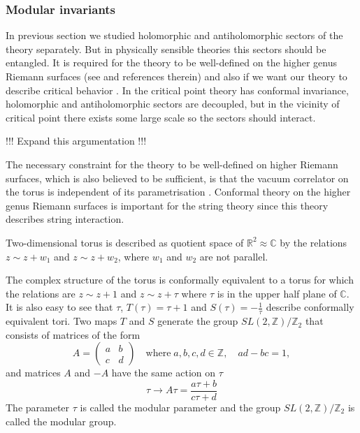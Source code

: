 \documentclass[a4paper,12pt]{article}
\theoremstyle{definition} \newtheorem{Def}{Definition}
\begin{document}
\subsubsection{Modular invariants}
\label{sec:modular-invariants}

In previous section we studied holomorphic and antiholomorphic sectors of the theory separately. But in physically sensible theories this sectors should be entangled. It is required for the theory to be well-defined on the higher genus Riemann surfaces (see \cite{gaberdiel2000icf} and references therein) and also if we want our theory to describe critical behavior \cite{difrancesco1997cft}. In the critical point theory has conformal invariance, holomorphic and antiholomorphic sectors are decoupled, but in the vicinity of critical point there exists some large scale so the sectors should interact.

!!! Expand this argumentation !!!

The necessary constraint for the theory to be well-defined on higher Riemann surfaces, which is also believed to be sufficient, is that the vacuum correlator on the torus is independent of its parametrisation \cite{gaberdiel2000icf}. Conformal theory on the higher genus Riemann surfaces is important for the string theory since this theory describes string interaction.

Two-dimensional torus is described as quotient space of $\mathbb{R}^2\approx \mathbb{C}$ by the relations $z\sim z+w_1$ and $z\sim z+w_2$, where $w_1$ and $w_2$ are not parallel. 

The complex structure of the torus is conformally equivalent to a torus for which the relations are $z\sim z+1$ and $z\sim z+\tau$ where $\tau$ is in the upper half plane of $\mathbb{C}$. It is also easy to see that $\tau$, $T(\tau)=\tau+1$ and $S(\tau)=-\frac{1}{\tau}$ describe conformally equivalent tori. Two maps $T$ and $S$ generate the group $SL(2,\mathbb{Z})/\mathbb{Z}_2$ that consists of matrices of the form
\begin{equation}
  \label{eq:99}
  A=
  \begin{pmatrix}
    a & b\\
    c & d 
  \end{pmatrix}
  \quad\mbox{where}\; a,b,c,d\in\mathbb{Z},\quad ad-bc=1,
\end{equation}
and matrices $A$ and $-A$ have the same action on $\tau$
\begin{equation}
  \label{eq:100}
  \tau\to A\tau=\frac{a\tau+b}{c\tau+d}
\end{equation}
The parameter $\tau$ is called the modular parameter and the group  $SL(2,\mathbb{Z})/\mathbb{Z}_2$ is called the modular group. 
\end{document}
